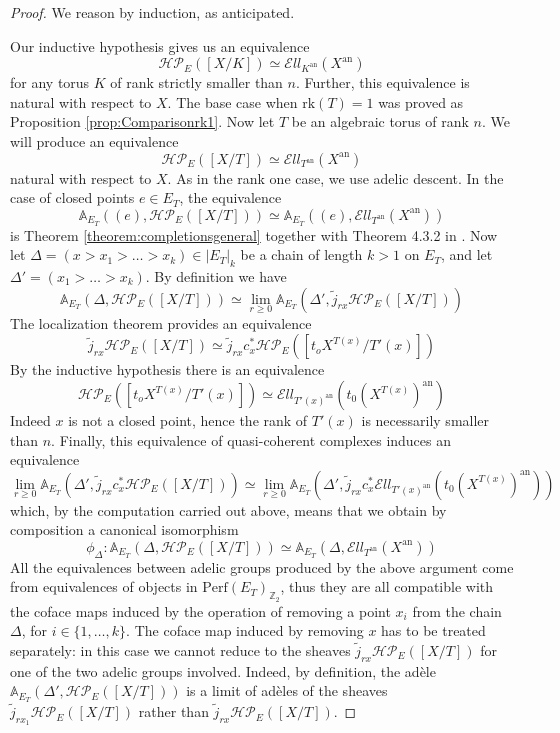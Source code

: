 \documentclass[11pt,letterpaper]{amsart}
\newcommand{\bA}{\mathbb{A}}
\newcommand{\bZ}{\mathbb{Z}}
\newcommand{\cHP}{\mathcal{HP}}
\newcommand{\El}{\mathcal{E}ll}
\newcommand{\an}{\mathrm{an}}
\newcommand{\Perf}{\mathrm{Perf}}
\begin{document}
\begin{proof}
We reason by induction, as anticipated. 

Our inductive hypothesis gives us an equivalence $$\cHP_E([X/K])\simeq\El_{K^{\an}}(X^{\an})$$ for any torus $K$ of rank strictly smaller than $n$. Further, this equivalence is natural with respect to $X$. The base case when $\mathrm{rk}(T)=1$ was proved as Proposition \ref{prop:Comparisonrk1}.
Now let $T$ be an algebraic torus of rank $n$. We will produce an equivalence 
$$\cHP_E([X/T])\simeq\El_{T^{\an}}(X^{\an})$$
natural with respect to $X$. 
As in the rank one case, we use adelic descent. 
In the case of closed points $e\in E_T$, the equivalence
$$\bA_{E_T}\left ((e), \cHP_E([X/T])\right )\simeq\bA_{E_T}\left ((e), \El_{T^{\an}}(X^{\an})\right )$$
is Theorem \ref{theorem:completionsgeneral} together with Theorem 4.3.2 in \cite{HChen}. Now let $\Delta=(x>x_1>\dots>x_k)\in |E_T|_{k}$ be a chain of length $k>1$ on $E_T$, and let $\Delta '=(x_1>\dots>x_k)$. By definition we have
$$\bA_{E_T}\left (\Delta, \cHP_E([X/T])\right )\simeq \lim_{r\geq 0}\bA_{E_T}\left (\Delta', \tilde{j}_{rx}\cHP_E([X/T])\right )$$
The localization theorem provides an equivalence
$$\tilde{j}_{rx}\cHP_E([X/T])\simeq\tilde{j}_{rx}c_x^\ast\cHP_E([t_o X^{T(x)}/T'(x)])$$
By the inductive hypothesis there is an equivalence 
$$\cHP_E([t_o X^{T(x)}/T'(x)])\simeq\El_{T'(x)^{\an}}(t_0(X^{T(x)})^{\an})$$
Indeed $x$ is not a closed point, hence the rank of $T'(x)$ is necessarily smaller than $n$. Finally, this equivalence of quasi-coherent complexes induces an equivalence
$$\lim_{r\geq 0}\bA_{E_T}\left (\Delta', \tilde{j}_{rx}c_x^\ast\cHP_E([X/T])\right )\simeq\lim_{r\geq 0}\bA_{E_T}\left (\Delta', \tilde{j}_{rx}c_x^\ast\El_{T'(x)^\an}(t_0(X^{T(x)})^\an)\right )$$
which, by the computation carried out above, means that we obtain by composition a canonical isomorphism
$$\phi_{\Delta}:\bA_{E_T}\left (\Delta, \cHP_E([X/T])\right )\simeq \bA_{E_T}\left (\Delta, \El_{T^\an}(X^\an)\right )$$
All the equivalences between adelic groups produced by the above argument come from equivalences of objects in $\Perf(E_T)_{\bZ_2}$, thus they are all compatible with the coface maps induced by the operation of removing a point $x_i$ from the chain $\Delta$, for $i\in \{1,\dots,k\}$. The coface map induced by removing $x$ has to be treated separately: in this case we cannot reduce to the sheaves $\tilde{j}_{rx}\cHP_E([X/T])$ for one of the two adelic groups involved. 
Indeed, by definition, the ad\`ele $\bA_{E_T}\left (\Delta',\cHP_E([X/T])\right )$ is a limit of ad\`eles of the sheaves $\tilde{j}_{rx_1}\cHP_E([X/T])$ rather than $\tilde{j}_{rx}\cHP_E([X/T])$.


\end{proof}
\end{document}

